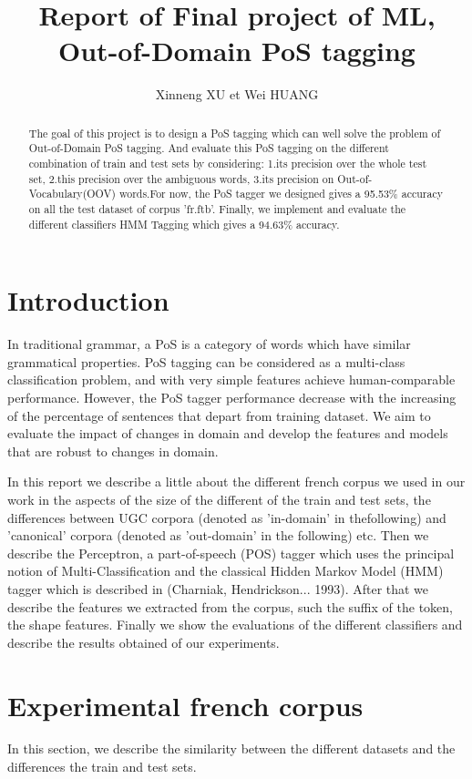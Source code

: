 \documentclass{article}
\title{Report of Final project of ML, Out-of-Domain PoS tagging}
\author{Xinneng XU et Wei HUANG}
\begin{document}
\maketitle

\begin{abstract}
The goal of this project is to design a PoS tagging which can well solve the problem of Out-of-Domain PoS tagging. And evaluate this PoS tagging on the different combination of train and test sets by considering: 1.its precision over the whole test set, 2.this precision over the ambiguous words, 3.its precision on Out-of-Vocabulary(OOV) words.For now, the PoS tagger we designed gives a 95.53\% accuracy on all the test dataset of corpus 'fr.ftb'. Finally, we implement and evaluate the different classifiers HMM Tagging which gives a 94.63\% accuracy.
\end{abstract}


\section{Introduction}
In traditional grammar, a PoS is a category of words which have similar grammatical properties. PoS tagging can be considered as a multi-class classification problem, and with very simple features achieve human-comparable performance. However, the PoS tagger performance decrease with the increasing of the percentage of sentences that depart from training dataset. We aim to evaluate the impact of changes in domain and develop the features and models that are robust to changes in domain.

In this report we describe a little about the different french corpus we used in our work in the aspects of the size of the different of the train and test sets, the differences between UGC corpora (denoted as 'in-domain' in thefollowing) and 'canonical' corpora (denoted as 'out-domain' in the following) etc. Then we describe the Perceptron, a part-of-speech (POS) tagger which uses the principal notion of Multi-Classification and the classical Hidden Markov Model (HMM) tagger which is described in (Charniak, Hendrickson... 1993). After that we describe the features we extracted from the corpus, such the suffix of the token, the shape features. Finally we show the evaluations of the different classifiers and describe the results obtained of our experiments.


\section{Experimental french corpus}
In this section, we describe the similarity between the different datasets and the differences the train and test sets.
\end{document}
